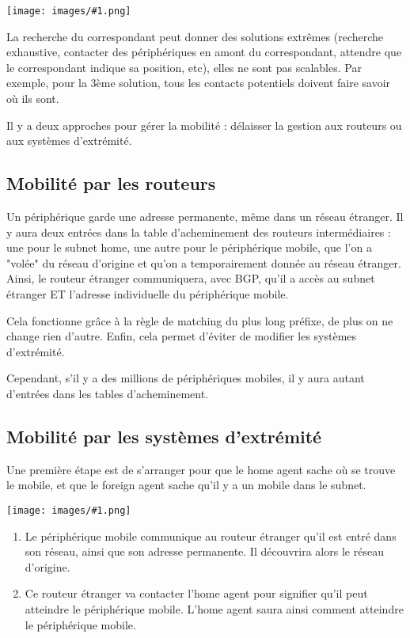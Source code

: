 \documentclass[10pt,a4paper]{report}
\newcommand{\dessin}[1]{\begin{center}\texttt{[image: images/\#1.png]}\end{center}}
\begin{document}
	\dessin{50}
	
  
	La recherche du correspondant peut donner des solutions extrêmes (recherche exhaustive, contacter des périphériques en amont du correspondant, attendre que le correspondant indique sa position, etc), elles ne sont pas scalables. Par exemple, pour la 3ème solution, tous les contacts potentiels doivent faire savoir où ils sont.
	
	Il y a deux approches pour gérer la mobilité : délaisser la gestion aux routeurs ou aux systèmes d'extrémité.
  
  	\subsection{Mobilité par les routeurs}
  	
	Un périphérique garde une adresse permanente, même dans un réseau étranger. Il y aura deux entrées dans la table d'acheminement des routeurs intermédiaires : une pour le subnet home, une autre pour le périphérique mobile, que l'on a "volée" du réseau d'origine et qu'on a temporairement donnée au réseau étranger. Ainsi, le routeur étranger communiquera, avec BGP, qu'il a accès au subnet étranger ET l'adresse individuelle du périphérique mobile.
  
	Cela fonctionne grâce à la règle de matching du plus long préfixe, de plus on ne change rien d'autre. Enfin, cela permet d'éviter de modifier les systèmes d'extrémité.
	
	Cependant, s'il y a des millions de périphériques mobiles, il y aura autant d'entrées dans les tables d'acheminement.
	
	\subsection{Mobilité par les systèmes d'extrémité}
	
	Une première étape est de s'arranger pour que le home agent sache où se trouve le mobile, et que le foreign agent sache qu'il y a un mobile dans le subnet.
	
	\dessin{52}
	
	\begin{enumerate}
		\item Le périphérique mobile communique au routeur étranger qu'il est entré dans son réseau, ainsi que son adresse permanente. Il découvrira alors le réseau d'origine.
		\item Ce routeur étranger va contacter l'home agent pour signifier qu'il peut atteindre le périphérique mobile. L'home agent saura ainsi comment atteindre le périphérique mobile.
	\end{enumerate}
  
\end{document}
